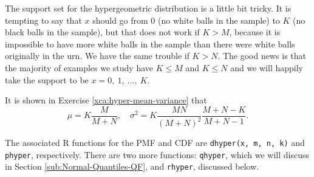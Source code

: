 \documentclass[captions=tableheading]{scrbook}
\begin{document}
The support set for the hypergeometric distribution is a little bit tricky. It is tempting to say that \(x\) should go from 0 (no white balls in the sample) to \(K\) (no black balls in the sample), but that does not work if \(K>M\), because it is impossible to have more white balls in the sample than there were white balls originally in the urn. We have the same trouble if \(K>N\). The good news is that the majority of examples we study have \(K\leq M\) and \(K\leq N\) and we will happily take the support to be \(x=0,\ 1,\ \ldots,\ K\). 

It is shown in Exercise \ref{xca:hyper-mean-variance} that
\begin{equation}
\mu=K\frac{M}{M+N},\quad\sigma^{2}=K\frac{MN}{(M+N)^{2}}\frac{M+N-K}{M+N-1}.
\end{equation}

The associated \textsf{R} functions for the PMF and CDF are \texttt{dhyper(x, m, n, k)} and \texttt{phyper}, respectively. There are two more functions: \texttt{qhyper}, which we will discuss in Section \ref{sub:Normal-Quantiles-QF}, and \texttt{rhyper}, discussed below.
\end{document}
